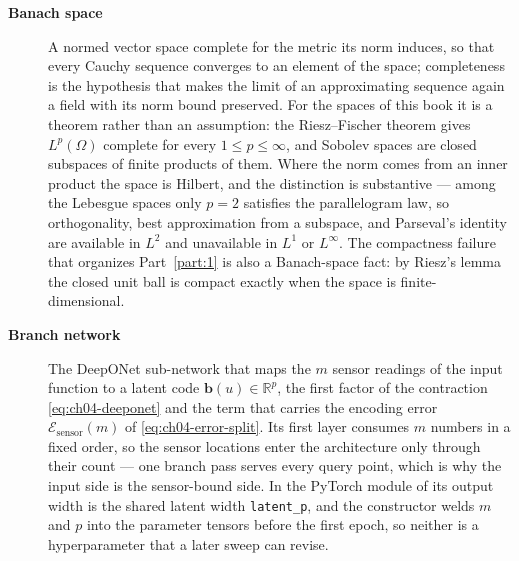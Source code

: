\begin{description}
\item[\textbf{Banach space}] A normed vector space complete for the metric its norm
induces, so that every Cauchy sequence converges to an element of the space;
completeness is the hypothesis that makes the limit of an approximating sequence
again a field with its norm bound preserved. For the spaces of this book it is a
theorem rather than an assumption: the Riesz--Fischer theorem gives $L^{p}(\Omega)$
complete for every $1 \le p \le \infty$, and Sobolev spaces are closed subspaces of
finite products of them. Where the norm comes from an inner product the space is
Hilbert, and the distinction is substantive --- among the Lebesgue spaces only
$p = 2$ satisfies the parallelogram law, so orthogonality, best approximation from a
subspace, and Parseval's identity are available in $L^{2}$ and unavailable in
$L^{1}$ or $L^{\infty}$. The compactness failure that organizes Part~\ref{part:1} is
also a Banach-space fact: by Riesz's lemma the closed unit ball is compact exactly
when the space is finite-dimensional. 

\item[\textbf{Branch network}] The DeepONet sub-network that maps the $m$ sensor
readings of the input function to a latent code $\mathbf{b}(u) \in \mathbb{R}^{p}$,
the first factor of the contraction \eqref{eq:ch04-deeponet} and the term that
carries the encoding error $\mathcal{E}_{\text{sensor}}(m)$ of
\eqref{eq:ch04-error-split}. Its first layer consumes $m$ numbers in a fixed order,
so the sensor locations enter the architecture only through their count --- one
branch pass serves every query point, which is why the input side is the sensor-bound
side. In the PyTorch module of 
its output width is the shared latent width \texttt{latent\_p}, and the constructor
welds $m$ and $p$ into the parameter tensors before the first epoch, so neither is a
hyperparameter that a later sweep can revise. 


\end{description}
